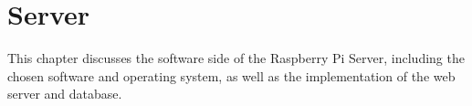 \chapter{Server}  \label{sec:raspberry_pi}
This chapter discusses the software side of the Raspberry Pi Server,
including the chosen software and operating system, as well 
as the implementation of the web server and database.
    






    
    

    